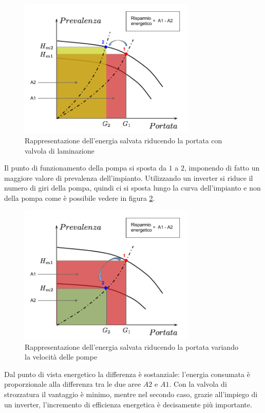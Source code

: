 \documentclass[laurea,oneside,11pt]{USiena_tesiLM}
\begin{document}
\begin{figure}[!ht]
\centering
\includegraphics[width=0.75\textwidth]{figure/strozzatura} 
\caption{Rappresentazione dell'energia salvata riducendo la portata con valvola di laminazione}
\label{fig:strozzatura}
\end{figure}

Il punto di funzionamento della pompa si sposta da $1$ a $2$, imponendo di fatto un maggiore valore di prevalenza dell'impianto. Utilizzando un inverter si riduce il numero di giri della pompa, quindi ci si sposta lungo la curva dell'impianto e non della pompa come è possibile vedere in figura \ref{fig:var_velocita}. 

\begin{figure}[!ht]
\centering
\includegraphics[width=0.75\textwidth]{figure/var_velocita} 
\caption{Rappresentazione dell'energia salvata riducendo la portata variando la velocità delle pompe}
\label{fig:var_velocita}
\end{figure}

Dal punto di vista energetico la differenza è sostanziale: l'energia consumata è proporzionale alla differenza tra le due aree $A2$ e $A1$. Con la valvola di strozzatura il vantaggio è minimo, mentre nel secondo caso, grazie all'impiego di un inverter, l'incremento di efficienza energetica è decisamente più importante.
\end{document}
